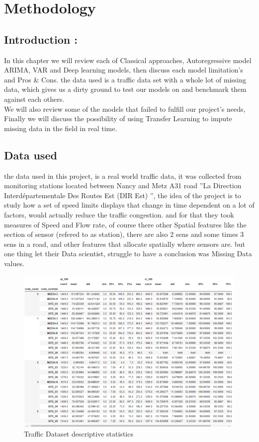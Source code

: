 \chapter{Methodology} \label{ML}

\section{Introduction :}\label{contextofimp}
In this chapter we will review each of Classical approaches, Autoregressive model ARIMA, VAR and Deep learning models, then discuss each model  limitation's and Pros & Cons.
the data used is a traffic data set with a whole lot of missing data, which gives us a dirty ground to test our models on and benchmark them against each others.\\We will also review some of the models that failed to fulfill our project's needs, Finally we will discuss the possibility of using Transfer Learning to impute missing data in the field in real time.

\section{Data used}
the  data used in this project, is a real world traffic data, it was collected from  monitoring stations located between Nancy and  Metz  A31  road ''La Direction Interdépartementale Des Routes Est (DIR Est) '', the idea of the project is to study  how  a set of speed limits displays that change in time dependent on a lot of factors, would actually reduce the traffic congestion.
and for that they took measures of Speed and Flow rate, of course there other Spatial features like the section of sensor (refered to as station), there are also 2 sens and some times 3 sens in a road, and other features that allocate spatially where sensors are.
but one thing let their Data scientist, struggle to have a conclusion was Missing Data values.

\begin{figure}[H]
\centering
\includegraphics[scale=.5]{img/grouped_data_descriptives.png} 
\caption{Traffic Dataset descriptive statistics}
\label{fig:score}
\end{figure}


